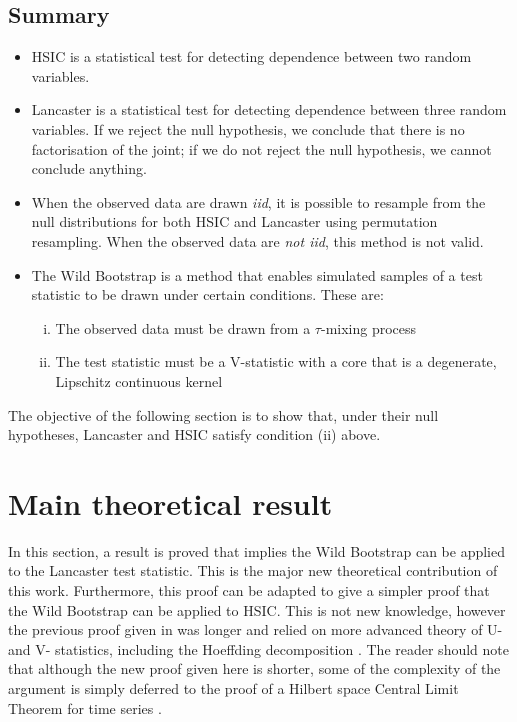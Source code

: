 \documentclass[12pt]{article}
\numberwithin{claim}{section}
\numberwithin{lemma}{section}
\numberwithin{theorem}{section}
\begin{document}
\subsection{Summary}
\begin{itemize}
\item HSIC is a statistical test for detecting dependence between two random variables.
\item Lancaster is a statistical test for detecting dependence between three random variables. If we reject the null hypothesis, we conclude that there is no factorisation of the joint; if we do not reject the null hypothesis, we cannot conclude anything.
\item When the observed data are drawn \emph{iid}, it is possible to resample from the null distributions for both HSIC and Lancaster using permutation resampling. When the observed data are \emph{not iid}, this method is not valid.
\item The Wild Bootstrap is a method that enables simulated samples of a test statistic to be drawn under certain conditions. These are:
\begin{enumerate}[(i)]
	\item The observed data must be drawn from a $\tau$-mixing process
	\item The test statistic must be a V-statistic with a core that is a degenerate, Lipschitz continuous kernel	
\end{enumerate}
\end{itemize}

The objective of the following section is to show that, under their null hypotheses, Lancaster and HSIC satisfy condition (ii) above.

\newpage

\section{Main theoretical result}
In this section, a result is proved that implies the Wild Bootstrap can be applied to the Lancaster test statistic. This is the major new theoretical contribution of this work. Furthermore, this proof can be adapted to give a simpler proof that the Wild Bootstrap can be applied to HSIC. This is not new knowledge, however the previous proof given in \cite{chwialkowski2014kernel} was longer and relied on more advanced theory of U- and V- statistics, including the Hoeffding decomposition \cite{serfling2009approximation}. The reader should note that although the new proof given here is shorter, some of the complexity of the argument is simply deferred to the proof of a Hilbert space Central Limit Theorem for time series \cite{dehling2015bootstrap}.
\end{document}
